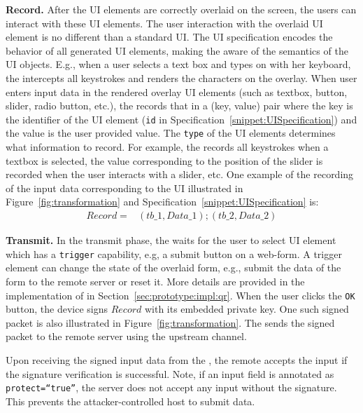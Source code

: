 \begin{mylist}
\item \textbf{Record.} After the UI elements are correctly overlaid on the screen, the users can interact with these UI elements. The user interaction with the overlaid UI element is no different than a standard UI. The UI specification encodes the behavior of all generated UI elements, making the \device aware of the semantics of the UI objects. E.g., when a user selects a text box and types on with her keyboard, the \device intercepts all keystrokes and renders the characters on the overlay.
When user enters input data in the rendered overlay UI elements (such as textbox, button, slider, radio button, etc.), the \device records that in a (key, value) pair where the key is the identifier of the UI element (\texttt{id} in Specification~\ref{snippet:UISpecification}) and the value is the user provided value. The \texttt{type} of the UI elements determines what information to record. For example, the \device records all keystrokes when a textbox is selected, the value corresponding to the position of the slider is recorded when the user interacts with a slider, etc. One example of the recording of the input data corresponding to the UI illustrated in Figure~\ref{fig:transformation} and Specification~\ref{snippet:UISpecification} is: 
\begin{align*}
Record = & (tb\_1, Data\_1);(tb\_2,Data\_2)
\end{align*}

\item \textbf{Transmit.} In the transmit phase, the \device waits for the user to select UI element which has a \texttt{trigger} capability, e.g, a submit button on a web-form. A trigger element can change the state of the overlaid form, e.g., submit the data of the form to the remote server or reset it. More details are provided in the implementation of \name in Section~\ref{sec:prototype:impl:qr}. When the user clicks the \texttt{OK} button, the device signs $Record$ with its embedded private key. One such signed packet is also illustrated in Figure~\ref{fig:transformation}. The \device sends the signed packet to the remote server using the upstream channel.
\end{mylist} 

Upon receiving the signed input data from the \device, the remote accepts the input if the signature verification is successful. Note, if an input field is annotated as \texttt{protect=``true''}, the server does not accept any input without the \device signature. This prevents the attacker-controlled host to submit data. 

